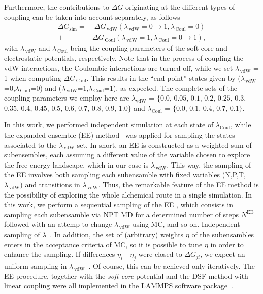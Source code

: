 \documentclass[3p,twocolumn]{elsarticle}
\begin{document}
Furthermore, the contributions to $\Delta G$ originating at the different types of coupling can be taken into account separately, as follows
\begin{equation}
\begin{split}
\Delta G_{\text{sim}} =& \; \Delta G_{\,\text{vdW}} (\lambda_{\,\text{vdW}} = 0\rightarrow  1, \lambda_{\, \text{Coul}} = 0) \\
+ \; &\Delta G_{\,\text{Coul}} (\lambda_{\, \text{vdW}} = 1,\lambda_{\,\text{Coul}} = 0 \rightarrow 1),
\end{split}
\end{equation}
with $\lambda_{\,\text{vdW}}$ and $\lambda_{\,\text{Coul}}$ being the coupling parameters of the soft-core and electrostatic potentials, respectively. Note that in the process of coupling the vdW interactions, the Coulombic interactions are turned-off, while we set $\lambda_{\,\text{vdW}}$ = 1 when computing $\Delta G_{\,\text{Coul}}$.  This results in the ``end-point'' states given by ($\lambda_{\,\text{vdW}}$=0,$\lambda_{\,\text{Coul}}$=0) and ($\lambda_{\,\text{vdW}}$=1,$\lambda_{\,\text{Coul}}$=1), as expected. The complete sets of the coupling parameters we employ here are $\lambda_{\text{vdW}}$ = $\{0.0$, $0.05$, $0.1$, $0.2$, $0.25$, $0.3$, $0.35$, $0.4$, $0.45$, $0.5$, $0.6$, $0.7$, $0.8$, $0.9$, $1.0\}$ and $\lambda_{\text{Coul}}$ = $\{0.0$, $0.1$, $0.4$, $0.7$, $0.1\}$.

In this work, we performed independent simulation at each state of $\lambda_{\text{Coul}}$, while the expanded ensemble (EE) method~\cite{Lyubartsev_1992} was applied for sampling the states associated to the $\lambda_{\,\text{vdW}}$ set. In short, an EE is constructed as a weighted sum of subensembles, each assuming a different value of the variable chosen to explore the free energy landscape, which in our case is $\lambda_{\,\text{vdW}}$. This way, the sampling of the EE involves both sampling each subensamble with fixed variables (N,P,T,$\lambda_{\,\text{vdW}}$) and transitions in $\lambda_{\,\text{vdW}}$. Thus, the remarkable feature of the EE method is the possibility of exploring the whole alchemical route in a single simulation. In this work, we perform a sequential sampling of the EE \cite{Chodera_2011_2}, which consists in sampling each subensamble via NPT MD for a determined number of steps $N^{\text{EE}}$ followed with an attemp to change $\lambda_{\,\text{vdW}}$ using MC, and so on. Independent sampling of $\lambda$~\cite{Chodera_2011_2}. In addition, the set of (arbitrary) weights $\eta$ of the subensambles enters in the acceptance criteria of MC, so it is possible to tune $\eta$ in order to enhance the sampling. If differences $\eta_i$ - $\eta_j$ were closed to $\Delta G_{ji}$, we expect an uniform sampling in $\lambda_{\,\text{vdW}}$~\cite{Lyubartsev_1992}. Of course, this can be achieved only iteratively. The EE procedure, together with the \textit{soft-core} potential and the DSF method with linear coupling were all implemented in the LAMMPS software package~\cite{Plimpton1995}.
\end{document}
